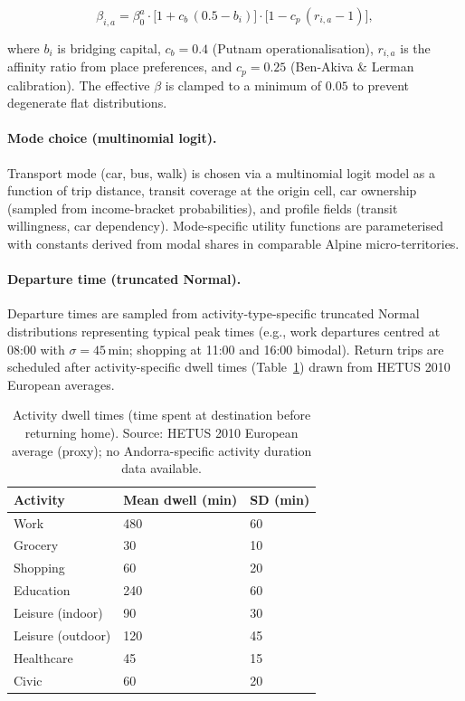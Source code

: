 \documentclass[a4paper,12pt]{article}
\begin{document}
\begin{equation}
  \beta_{i,a} = \beta_0^a
    \cdot \bigl[1 + c_b\,(0.5 - b_i)\bigr]
    \cdot \bigl[1 - c_p\,(r_{i,a} - 1)\bigr],
\end{equation}

where $b_i$ is bridging capital, $c_b = 0.4$ (Putnam operationalisation),
$r_{i,a}$ is the affinity ratio from place preferences, and $c_p = 0.25$
(Ben-Akiva \& Lerman calibration). The effective $\beta$ is clamped to a
minimum of $0.05$ to prevent degenerate flat distributions.

\paragraph{Mode choice (multinomial logit).}
Transport mode (car, bus, walk) is chosen via a multinomial logit model
as a function of trip distance, transit coverage at the origin cell, car
ownership (sampled from income-bracket probabilities), and profile fields
(transit willingness, car dependency). Mode-specific utility functions are
parameterised with constants derived from modal shares in comparable
Alpine micro-territories.

\paragraph{Departure time (truncated Normal).}
Departure times are sampled from activity-type-specific truncated Normal
distributions representing typical peak times (e.g., work departures
centred at 08:00 with $\sigma = 45$\,min; shopping at 11:00 and 16:00
bimodal). Return trips are scheduled after activity-specific dwell times
(Table~\ref{tab:dwell}) drawn from HETUS 2010 European averages.

\begin{table}[H]
\caption{Activity dwell times (time spent at destination before returning home).
Source: HETUS 2010 European average (proxy); no Andorra-specific
activity duration data available.}
\label{tab:dwell}
\begin{tabularx}{\textwidth}{lXX}
\toprule
\textbf{Activity} & \textbf{Mean dwell (min)} & \textbf{SD (min)} \\
\midrule
Work             & 480 & 60 \\
Grocery          &  30 & 10 \\
Shopping         &  60 & 20 \\
Education        & 240 & 60 \\
Leisure (indoor) &  90 & 30 \\
Leisure (outdoor)& 120 & 45 \\
Healthcare       &  45 & 15 \\
Civic            &  60 & 20 \\
\bottomrule
\end{tabularx}
\end{table}
\end{document}
